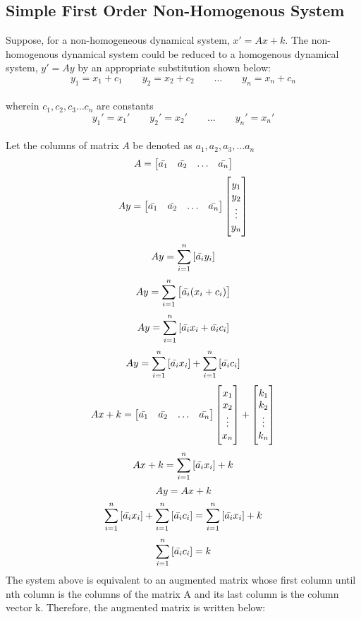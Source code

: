 \documentclass[class=report, 12pt, crop=false]{standalone}
\begin{document}
\begin{center}
\section{Simple First Order Non-Homogenous System}
\begin{comment}
\end{comment}
Suppose, for a non-homogeneous dynamical system, $x' = Ax + k$. The non-homogenous dynamical system could be reduced to a homogenous dynamical system, $y' = Ay$ by an appropriate substitution shown below:  
$$y_1 = x_1 + c_1 \qquad y_2 = x_2 + c_2 \qquad \dots \qquad y_n = x_n + c_n $$
\\wherein $c_1, c_2, c_3 \dots c_n$ are constants
$$y_1' = x_1' \qquad y_2' = x_2' \qquad \dots \qquad y_n' = x_n'$$
\\Let the columns of matrix $A$ be denoted as $a_1, a_2, a_3,\dots a_n$
$$A = \begin{bmatrix} \bar{a_1} & \bar{a_2} &\dots & \bar{a_n} \end{bmatrix}$$
$$Ay = \begin{bmatrix} \bar{a_1} & \bar{a_2} &\dots & \bar{a_n} \end{bmatrix} \begin{bmatrix}y_1 \\ y_2 \\ \vdots \\ y_n \end{bmatrix}$$
$$Ay = \sum_{i = 1} ^ {n} \left[\bar{a_i}y_i\right]$$
$$Ay = \sum_{i = 1} ^ {n} \left[\bar{a_i}(x_i +c_i)\right]$$
$$Ay = \sum_{i = 1} ^ {n} \left[\bar{a_i}x_i + \bar{a_i}c_i\right]$$
$$Ay = \sum_{i = 1} ^ {n} \left[\bar{a_i}x_i\right] + \sum_{i = 1} ^ {n} \left[\bar{a_i}c_i\right]$$
$$Ax + k= \begin{bmatrix} \bar{a_1} & \bar{a_2} &\dots & \bar{a_n} \end{bmatrix} \begin{bmatrix}x_1 \\ x_2 \\ \vdots \\ x_n \end{bmatrix} + \begin{bmatrix} k_1 \\k_2 \\\vdots \\k_n\end{bmatrix}$$
$$Ax + k = \sum_{i = 1}^{n} \left[\bar{a_i}x_i\right] + k$$
$$Ay = Ax + k$$
$$\sum_{i = 1} ^ {n} \left[\bar{a_i}x_i\right] + \sum_{i = 1} ^ {n} \left[\bar{a_i}c_i\right] = \sum_{i = 1}^{n} \left[\bar{a_i}x_i\right] + k$$
$$\sum_{i = 1} ^ {n} \left[\bar{a_i}c_i\right] =  k$$
The system above is equivalent to an augmented matrix whose first column until nth column is the columns of the matrix A and its last column is the column vector k. Therefore, the augmented matrix is written below:

\end{center}
\end{document}
